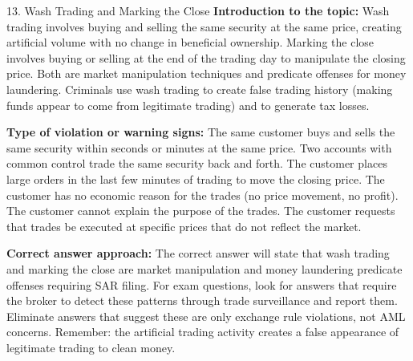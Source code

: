 \documentclass[11pt,a4paper]{beamer}
\begin{document}
\begin{frame}{13. Wash Trading and Marking the Close}
\tiny
\noindent\textbf{Introduction to the topic:} Wash trading involves buying and selling the same security at the same price, creating artificial volume with no change in beneficial ownership. Marking the close involves buying or selling at the end of the trading day to manipulate the closing price. Both are market manipulation techniques and predicate offenses for money laundering. Criminals use wash trading to create false trading history (making funds appear to come from legitimate trading) and to generate tax losses.

\vspace{0.1cm}
\noindent\textbf{Type of violation or warning signs:} The same customer buys and sells the same security within seconds or minutes at the same price. Two accounts with common control trade the same security back and forth. The customer places large orders in the last few minutes of trading to move the closing price. The customer has no economic reason for the trades (no price movement, no profit). The customer cannot explain the purpose of the trades. The customer requests that trades be executed at specific prices that do not reflect the market.

\vspace{0.1cm}
\noindent\textbf{Correct answer approach:} The correct answer will state that wash trading and marking the close are market manipulation and money laundering predicate offenses requiring SAR filing. For exam questions, look for answers that require the broker to detect these patterns through trade surveillance and report them. Eliminate answers that suggest these are only exchange rule violations, not AML concerns. Remember: the artificial trading activity creates a false appearance of legitimate trading to clean money.
\end{frame}
\end{document}
